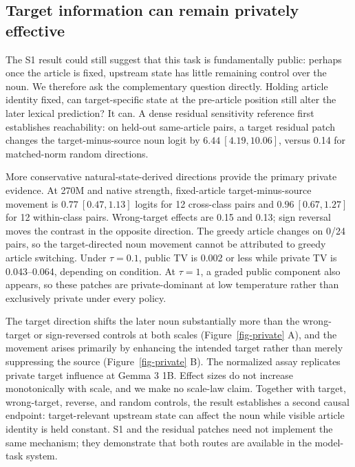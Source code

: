 \documentclass[
]{article}
\begin{document}
\subsection{Target information can remain privately
effective}\label{target-information-can-remain-privately-effective}

The S1 result could still suggest that this task is fundamentally
public: perhaps once the article is fixed, upstream state has little
remaining control over the noun. We therefore ask the complementary
question directly. Holding article identity fixed, can target-specific
state at the pre-article position still alter the later lexical
prediction? It can. A dense residual sensitivity reference first
establishes reachability: on held-out same-article pairs, a target
residual patch changes the target-minus-source noun logit by
\(6.44\ [4.19,10.06]\), versus 0.14 for matched-norm random directions.

More conservative natural-state-derived directions provide the primary
private evidence. At 270M and native strength, fixed-article
target-minus-source movement is \(0.77\ [0.47,1.13]\) logits for 12
cross-class pairs and \(0.96\ [0.67,1.27]\) for 12 within-class pairs.
Wrong-target effects are 0.15 and 0.13; sign reversal moves the contrast
in the opposite direction. The greedy article changes on 0/24 pairs, so
the target-directed noun movement cannot be attributed to greedy article
switching. Under \(\tau=0.1\), public TV is 0.002 or less while private
TV is 0.043--0.064, depending on condition. At \(\tau=1\), a graded
public component also appears, so these patches are private-dominant at
low temperature rather than exclusively private under every policy.

The target direction shifts the later noun substantially more than the
wrong-target or sign-reversed controls at both scales
(Figure~\ref{fig-private} A), and the movement arises primarily by
enhancing the intended target rather than merely suppressing the source
(Figure~\ref{fig-private} B). The normalized assay replicates private
target influence at Gemma 3 1B. Effect sizes do not increase
monotonically with scale, and we make no scale-law claim. Together with
target, wrong-target, reverse, and random controls, the result
establishes a second causal endpoint: target-relevant upstream state can
affect the noun while visible article identity is held constant. S1 and
the residual patches need not implement the same mechanism; they
demonstrate that both routes are available in the model-task system.
\end{document}

